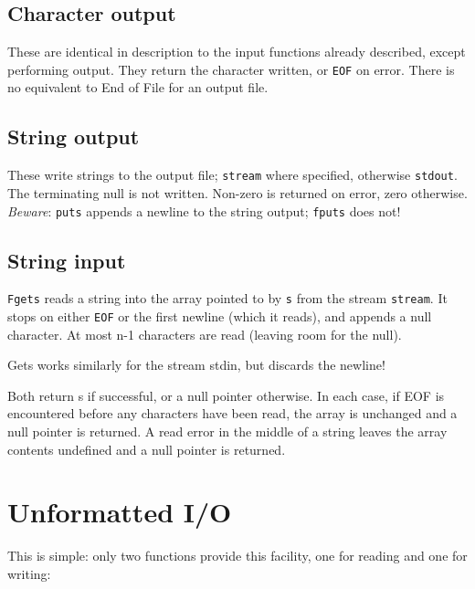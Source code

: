   

  \subsection{Character output}
   

   These are identical in description to the input functions already
    described, except performing output.  They return the character written, or
    \texttt{EOF} on error.  There is no equivalent to End of File for an
    output file.


  

  \subsection{String output}
   

   These write strings to the output file; \texttt{stream} where
    specified, otherwise \texttt{stdout}.  The terminating null is not
    written.  Non-zero is returned on error, zero otherwise.  \textit{Beware}:
    \texttt{puts} appends a newline to the string output;
    \texttt{fputs} does not!


  

  \subsection{String input}
   

   \texttt{Fgets} reads a string into the array pointed to by
    \texttt{s} from the stream \texttt{stream}.  It stops on either
    \texttt{EOF} or the first newline (which it reads), and appends a null
    character.  At most n-1 characters are read (leaving room for
    the null).


   Gets works similarly for the stream stdin, but discards the newline!


   Both return s if successful, or a null pointer otherwise.  In each case,
    if EOF is encountered before any characters have been read, the array is
    unchanged and a null pointer is returned.  A read error in the middle of
    a string leaves the array contents undefined and a null pointer is
    returned.


  

 
        \section{Unformatted I/O}
        

  

  This is simple: only two functions provide this facility, one for reading
   and one for writing:



